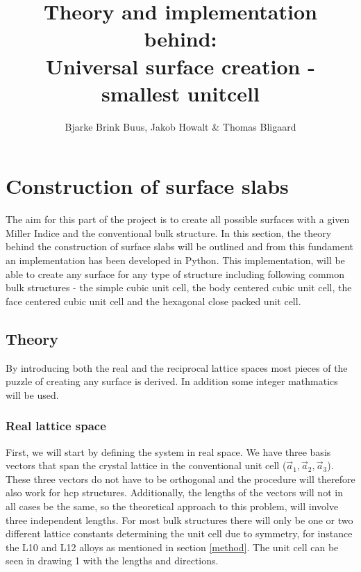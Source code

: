 \documentclass[11pt]{article} %
\title{Theory and implementation behind: \\Universal surface creation - smallest unitcell}
\author{Bjarke Brink Buus, Jakob Howalt \& Thomas Bligaard}
\begin{document}
\maketitle
\section{Construction of surface slabs}
The aim for this part of the project is to create all possible surfaces with a given Miller Indice and the conventional bulk structure. In this section, the theory behind the construction of surface slabs will be outlined and from this fundament an implementation has been developed in Python. This implementation, will be able to create any surface for any type of structure including following common bulk structures - the simple cubic unit cell, the body centered cubic unit cell, the face centered cubic unit cell and the hexagonal close packed unit cell.
\subsection{Theory}
By introducing both the real and the reciprocal lattice spaces most pieces of the puzzle of creating any surface is derived. In addition some integer mathmatics will be used.
\subsubsection{Real lattice space}
First, we will start by defining the system in real space. We have three basis vectors that span the crystal lattice in the conventional unit cell ($\vec{a}_1,\vec{a}_2,\vec{a}_3$). These three vectors do not have to be orthogonal and the procedure will therefore also work for hcp structures. Additionally, the lengths of the vectors will not in all cases be the same, so the theoretical approach to this problem, will involve three independent lengths. For most bulk structures there will only be one or two different lattice constants determining the unit cell due to symmetry, for instance the L10 and L12 alloys as mentioned in section \ref{method}. The unit cell can be seen in drawing 1 with the lengths and directions.
\end{document}
